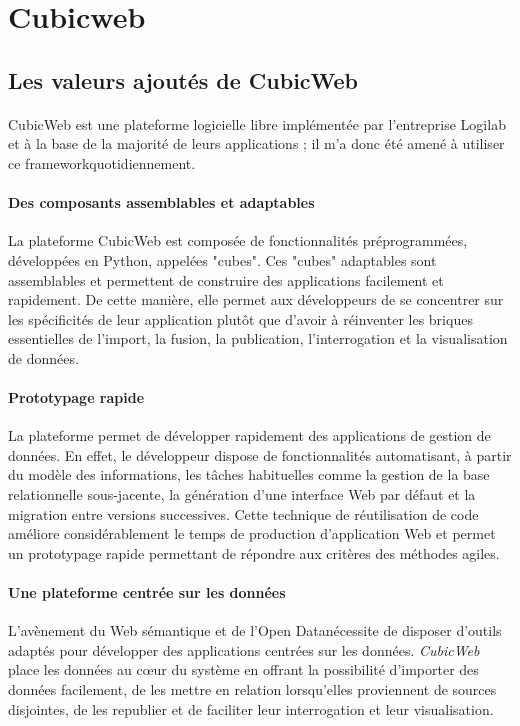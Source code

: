 \documentclass {report}
\begin{document}
\section{Cubicweb}
\subsection{Les valeurs ajoutés de CubicWeb}
\paragraph{}
CubicWeb est une plateforme logicielle libre implémentée par l'entreprise Logilab et à la base de la majorité de leurs applications ; il m'a donc été amené à utiliser ce framework\footnotemark[1] quotidiennement.



\paragraph{Des composants assemblables et adaptables}
La plateforme CubicWeb est composée de fonctionnalités préprogrammées, développées en Python, appelées "cubes". Ces "cubes" adaptables sont assemblables et permettent de construire des applications facilement et rapidement. De cette manière, elle permet aux développeurs de se concentrer sur les spécificités de leur application plutôt que d'avoir à réinventer les briques essentielles de l'import, la fusion, la publication, l'interrogation et la visualisation de données. 
\paragraph{Prototypage rapide}
La plateforme permet de développer rapidement des applications de gestion de données. En effet, le développeur dispose de fonctionnalités automatisant, à partir du modèle des informations, les tâches habituelles comme la gestion de la base relationnelle sous-jacente, la génération d'une interface Web par défaut et la migration entre versions successives. Cette technique de réutilisation de code améliore considérablement le temps de production d'application Web et permet un prototypage rapide permettant de répondre aux critères des méthodes agiles.

\paragraph{Une plateforme centrée sur les données}
L'avènement du Web sémantique et de l'Open Data\footnotemark[2] nécessite de disposer d'outils adaptés pour développer des applications centrées sur les données. \textit{CubicWeb} place les données au cœur du système en offrant la possibilité d'importer des données facilement, de les mettre en relation lorsqu'elles proviennent de sources disjointes, de les republier et de faciliter leur interrogation et leur visualisation. 
\end{document}
